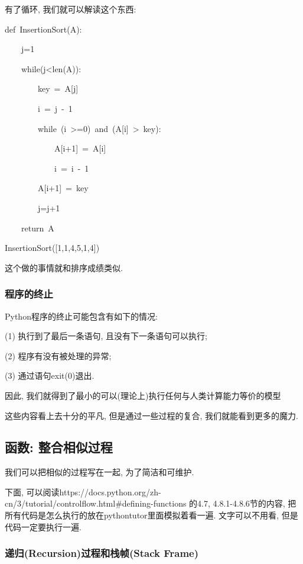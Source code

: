 有了循环, 我们就可以解读这个东西:
\begin{lyxcode}
def~InsertionSort(A):

~~~~j=1

~~~~while(j<len(A)):

~~~~~~~~key~=~A{[}j{]}

~~~~~~~~i~=~j~-~1

~~~~~~~~while~(i~>=0)~and~(A{[}i{]}~>~key):

~~~~~~~~~~~~A{[}i+1{]}~=~A{[}i{]}

~~~~~~~~~~~~i~=~i~-~1

~~~~~~~~A{[}i+1{]}~=~key

~~~~~~~~j=j+1

~~~~return~A

InsertionSort({[}1,1,4,5,1,4{]})
\end{lyxcode}
这个做的事情就和排序成绩类似. 


\subsubsection{程序的终止}
\begin{definition}
Python程序的终止可能包含有如下的情况:

(1) 执行到了最后一条语句, 且没有下一条语句可以执行;

(2) 程序有没有被处理的异常;

(3) 通过语句exit(0)退出. 
\end{definition}
因此, 我们就得到了最小的可以(理论上)执行任何与人类计算能力等价的模型

这些内容看上去十分的平凡, 但是通过一些过程的复合, 我们就能看到更多的魔力.

\subsection{函数: 整合相似过程}

我们可以把相似的过程写在一起, 为了简洁和可维护.

下面, 可以阅读https://docs.python.org/zh-cn/3/tutorial/controlflow.html\#defining-functions
的4.7, 4.8.1-4.8.6节的内容, 把所有代码是怎么执行的放在pythontutor里面模拟着看一遍. 文字可以不用看,
但是代码一定要执行一遍. 

\subsubsection{递归(Recursion)过程和栈帧(Stack Frame)}

